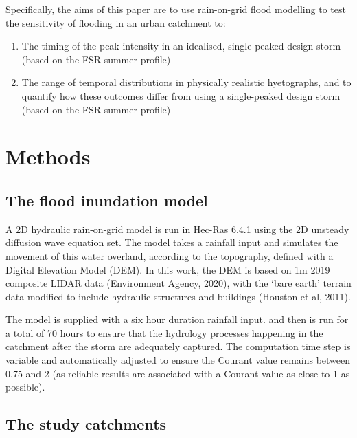 \documentclass[APA,Times2COL]{WileyNJDv5}
\begin{document}
Specifically, the aims of this paper are to use rain-on-grid flood modelling to test the sensitivity of flooding in an urban catchment to:

\begin{enumerate}
  \item The timing of the peak intensity in an idealised, single-peaked design storm (based on the FSR summer profile)
  \item The range of temporal distributions in physically realistic hyetographs, and to quantify how these outcomes differ from using a single-peaked design storm (based on the FSR summer profile)
\end{enumerate}


\section{Methods}\label{sec:methods}
\subsection{The flood inundation model}\label{subsec:model:catchments}

A 2D hydraulic rain-on-grid model is run in Hec-Ras 6.4.1 using the 2D unsteady diffusion wave equation set. The model takes a rainfall input and simulates the movement of this water overland, according to the topography, defined with a Digital Elevation Model (DEM). In this work, the DEM is based on 1m 2019 composite LIDAR data (Environment Agency, 2020), with the `bare earth' terrain data modified to include hydraulic structures and buildings (Houston et al, 2011). 


The model is supplied with a six hour duration rainfall input. and then is run for a total of 70 hours to ensure that the hydrology processes happening in the catchment after the storm are adequately captured. The computation time step is variable and automatically adjusted to ensure the Courant value remains between 0.75 and 2 (as reliable results are associated with a Courant value as close to 1 as possible).


\subsection{The study catchments}\label{subsec:model:catchments}
\end{document}
